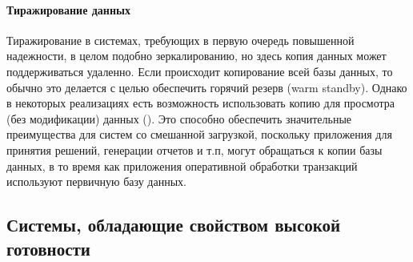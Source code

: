 \paragraph{Тиражирование данных}
Тиражирование в системах, требующих в первую очередь повышенной надежности, в
целом подобно зеркалированию, но здесь копия данных может поддерживаться
удаленно. Если происходит копирование всей базы данных, то обычно это делается с
целью обеспечить горячий резерв (warm standby). Однако в некоторых реализациях
есть возможность использовать копию для просмотра (без модификации) данных (\autocite{Baron}). Это способно обеспечить значительные преимущества для систем со смешанной загрузкой, поскольку приложения для принятия решений, генерации отчетов и т.п,
могут обращаться к копии базы данных, в то время как приложения оперативной обработки транзакций используют первичную базу данных.
\subsection{Системы, обладающие свойством высокой готовности}
